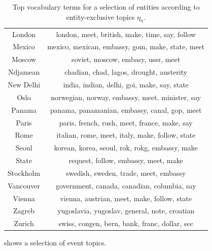\begin{table}
\begin{tabular}{cc}
London & london, meet, british, make, time, say, follow \\
Mexico & mexico, mexican, embassy, gom, make, state, meet \\
Moscow & soviet, moscow, embasy, ussr, meet \\
Ndjamean & chadian, chad, lagos, drought, austerity \\
New Delhi & india, indian, delhi, goi, make, say, state \\
Oslo & norwegian, norway, embassy, meet, minister, say \\
Panama & panama, panamanian, embassy, canal, gop, meet \\ 
Paris & paris, french, rush, meet, france, make, say \\
Rome & italian, rome, meet, italy, make, follow, state \\
Seoul & korean, korea, seoul, rok, rokg, embassy, make \\
State & request, follow, embassy, meet, make \\
Stockholm & swedish, sweden, trade, meet, embassy \\
Vancouver & government, canada, canadian, columbia, say \\
Vienna & vienna, austrian, meet, make, follow, state \\ 
Zagreb & yugoslavia, yugoslav, general, note, croatian \\ 
Zurich & swiss, congen, bern, bank, franc, dollar, sec \\
\bottomrule
\end{tabular}
\label{tab:enttopics}
\caption{Top vocabulary terms for a selection of entities according to entity-exclusive topics $\eta_n$.}
\end{table}

 shows a selection of event topics.

